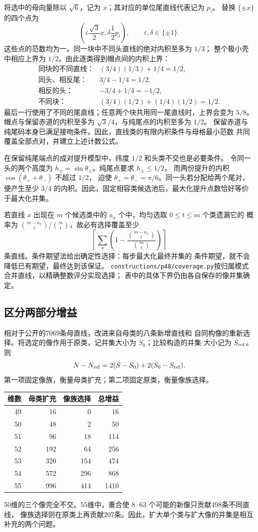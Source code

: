 将选中的母向量除以 $\sqrt6$，记为 $x$；其对应的单位尾直线代表记为 $p_i$。
替换 $\{\pm x\}$ 的四个点为
\[
 \left(\varepsilon\frac{\sqrt3}{2}x,
       \delta\frac12p_i\right),\qquad \varepsilon,\delta\in\{\pm1\}.
\]
这些点的范数均为一。同一块中不同头直线的绝对内积至多为 $1/3$；
整个极小壳中相应上界为 $1/2$。由此逐类得到帽点间的内积上界：
\[
\begin{array}{ll}
\text{同块的不同直线：}&(3/4)(1/3)+1/4=1/2,\\
\text{同头、相反尾：}&3/4-1/4=1/2,\\
\text{相反的头：}&-3/4+1/4=-1/2,\\
\text{不同块：}&(3/4)(1/2)+(1/4)(1/2)=1/2.
\end{array}
\]
最后一行使用了不同的尾直线；任意两个块共用同一尾直线时，上界会变为 $5/8$。
帽点与保留赤道的内积至多为 $\sqrt3/4$，与纯尾点的内积至多为 $1/2$。
保留赤道与纯尾码本身已满足接吻条件。因此，直线类的有限内积条件与母格最小范数
共同覆盖全部点对，并建立上述计数公式。

在保留纯尾端点的成对提升模型中，纬度 $1/2$ 和头类不交也是必要条件。
令同一头的两个高度为 $h_\pm=\sin\theta_\pm$。纯尾点要求 $h_\pm\le1/2$，
而两份提升的内积 $\cos(\theta_++\theta_-)$ 不超过 $1/2$，
迫使 $\theta_+=\theta_-=\pi/6$。同一头若分配给两个尾对，便产生至少
$3/4$ 的内积。因此，固定相容类候选池后，最大化提升点数恰好等价于最大化并集。

若直线 $x$ 出现在 $m$ 个候选类中的 $a_x$ 个中，均匀选取 $0\le t\le m$ 个类遗漏它的
概率为 $\binom{m-a_x}{t}/\binom mt$，故必有选择覆盖至少
\[
\left\lceil\sum_x\left(1-\frac{\binom{m-a_x}{t}}{\binom mt}\right)\right\rceil
\]
条直线。条件期望法\cite{raghavan1988}给出确定性选择：每步最大化最终并集的
条件期望，就不会降低已有期望，最终达到该保证。
\texttt{constructions/p48/coverage.py}按归属模式合并直线，以精确整数评分实现选择；
表中的具体下界仍由各自保存的像并集确定。

\subsection{区分两部分增益}

相对于公开的7069条母直线\cite{kissingnumbers}，改进来自母类的八条新增直线和
自同构像的重新选择。将选定的像作用于原类，记并集大小为 $S_0$；比较构造的并集
大小记为 $S_{\rm ref}$。则
\[
 N-N_{\rm ref}=2(S-S_0)+2(S_0-S_{\rm ref}).
\]
第一项固定像族，衡量母类扩充；第二项固定原类，衡量像族选择。

\begin{center}
\begin{tabular}{rrrr}
\toprule
维数&母类扩充&像族选择&总增益\\\midrule
49&16&0&16\\
50&48&2&50\\
51&96&18&114\\
52&192&64&256\\
53&320&154&474\\
54&572&296&868\\
55&996&414&1410\\\bottomrule
\end{tabular}
\end{center}

50维的三个像完全不交。55维中，重合使 $8\cdot63$ 个可能的新像只贡献498条不同直线，
像族选择则在原类上再贡献207条。因此，扩大单个类与扩大像的并集是相互补充的两个问题。
